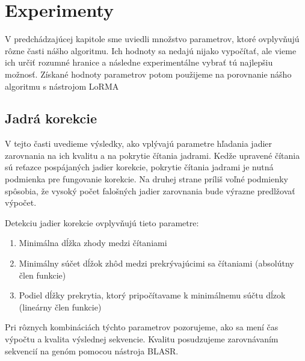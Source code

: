 \chapter{Experimenty}

V predchádzajúcej kapitole sme uviedli množstvo parametrov, ktoré ovplyvňujú rôzne časti nášho algoritmu. Ich hodnoty sa nedajú nijako vypočítať, ale vieme ich určiť rozumné hranice a následne experimentálne vybrať tú najlepšiu možnosť. Získané hodnoty parametrov potom použijeme na porovnanie nášho algoritmu s nástrojom LoRMA

\section{Jadrá korekcie}

V tejto časti uvedieme výsledky, ako vplývajú parametre hľadania jadier zarovnania na ich kvalitu a na pokrytie čítania jadrami. Kedže upravené čítania sú reťazce pospájaných jadier korekcie, pokrytie čítania jadrami je nutná podmienka pre fungovanie korekcie. Na druhej strane príliš voľné podmienky spôsobia, že vysoký počet falošných jadier zarovnania bude výrazne predlžovať výpočet.

Detekciu jadier korekcie ovplyvňujú tieto parametre:

\begin{enumerate}
\item Minimálna dĺžka zhody medzi čítaniami
\item Minimálny súčet dĺžok zhôd medzi prekrývajúcimi sa čítaniami (absolútny člen funkcie)
\item Podiel dĺžky prekrytia, ktorý pripočítavame k minimálnemu súčtu dĺzok (lineárny člen funkcie)
\end{enumerate}

Pri rôznych kombináciách týchto parametrov pozorujeme, ako sa mení čas výpočtu a kvalita výslednej sekvencie. Kvalitu posudzujeme zarovnávaním sekvencií na genóm pomocou nástroja BLASR. 